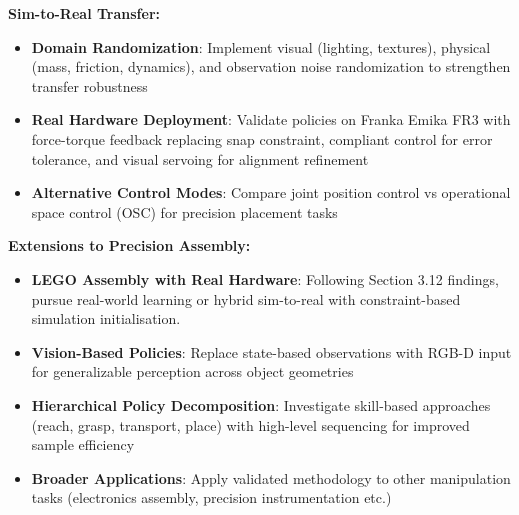 \documentclass[12pt,a4paper,oneside]{report}
\begin{document}
\textbf{Sim-to-Real Transfer:}
\begin{itemize}
    \item \textbf{Domain Randomization}: Implement visual (lighting, textures), physical (mass, friction, dynamics), and observation noise randomization to strengthen transfer robustness
    \item \textbf{Real Hardware Deployment}: Validate policies on Franka Emika FR3 with force-torque feedback replacing snap constraint, compliant control for error tolerance, and visual servoing for alignment refinement
    \item \textbf{Alternative Control Modes}: Compare joint position control vs operational space control (OSC) for precision placement tasks
\end{itemize}

\textbf{Extensions to Precision Assembly:}
\begin{itemize}
    \item \textbf{LEGO Assembly with Real Hardware}: Following Section 3.12 findings, pursue real-world learning or hybrid sim-to-real with constraint-based simulation initialisation.
    \item \textbf{Vision-Based Policies}: Replace state-based observations with RGB-D input for generalizable perception across object geometries
    \item \textbf{Hierarchical Policy Decomposition}: Investigate skill-based approaches (reach, grasp, transport, place) with high-level sequencing for improved sample efficiency
    \item \textbf{Broader Applications}: Apply validated methodology to other manipulation tasks (electronics assembly, precision instrumentation etc.)
\end{itemize}



\end{document}
